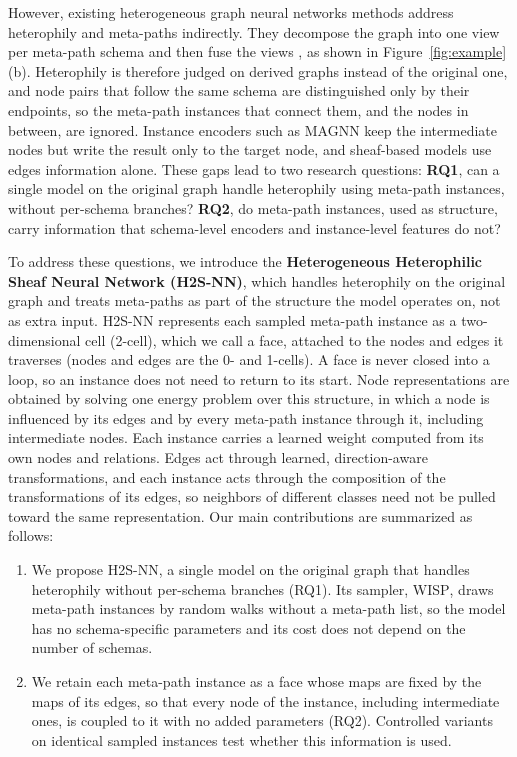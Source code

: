\documentclass{article}
\newcommand{\method}{\textsc{H2S-NN}}
\newcommand{\wisp}{\textsc{WISP}}
\begin{document}
However, existing heterogeneous graph neural networks methods address heterophily and meta-paths indirectly. They decompose the graph into one view per meta-path schema and then fuse the views \cite{lu2026addressing,chen2025adaptive,li2025hetero2net,guo2023homophily,shen2025heterophily,wang2025homophily}, as shown in Figure~\ref{fig:example}(b). Heterophily is therefore judged on derived graphs instead of the original one, and node pairs that follow the same schema are distinguished only by their endpoints, so the meta-path instances that connect them, and the nodes in between, are ignored. Instance encoders such as MAGNN \cite{fu2020magnn} keep the intermediate nodes but write the result only to the target node, and sheaf-based models \cite{braithwaite2024heterogeneous} use edges information alone. These gaps lead to two research questions: \textbf{RQ1}, can a single model on the original graph handle heterophily using meta-path instances, without per-schema branches? \textbf{RQ2}, do meta-path instances, used as structure, carry information that schema-level encoders and instance-level features do not?

To address these questions, we introduce the \textbf{Heterogeneous Heterophilic Sheaf Neural Network (\method{})}, which handles heterophily on the original graph and treats meta-paths as part of the structure the model operates on, not as extra input. \method{} represents each sampled meta-path instance as a two-dimensional cell (2-cell), which we call a face, attached to the nodes and edges it traverses (nodes and edges are the 0- and 1-cells). A face is never closed into a loop, so an instance does not need to return to its start. Node representations are obtained by solving one energy problem over this structure, in which a node is influenced by its edges and by every meta-path instance through it, including intermediate nodes. Each instance carries a learned weight computed from its own nodes and relations. Edges act through learned, direction-aware transformations, and each instance acts through the composition of the transformations of its edges, so neighbors of different classes need not be pulled toward the same representation. Our main contributions are summarized as follows:
\begin{enumerate}
\item We propose \method{}, a single model on the original graph that handles heterophily without per-schema branches (RQ1). Its sampler, \wisp{}, draws meta-path instances by random walks without a meta-path list, so the model has no schema-specific parameters and its cost does not depend on the number of schemas.
\item We retain each meta-path instance as a face whose maps are fixed by the maps of its edges, so that every node of the instance, including intermediate ones, is coupled to it with no added parameters (RQ2). Controlled variants on identical sampled instances test whether this information is used.
\end{enumerate}
\end{document}
